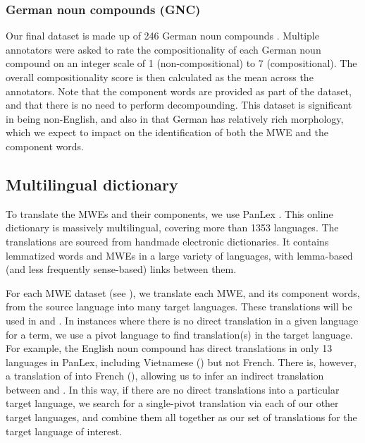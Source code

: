 \documentclass[output=paper
,modfonts
,nonflat]{langsci/langscibook}
\begin{document}
\subsubsection{German noun compounds (GNC)}

Our final dataset is made up of 246 German noun compounds
\citep{von2009,SchulteImWalde+:2013}. Multiple annotators were asked to rate the
compositionality of each German noun compound on an integer scale of 1
(non-compositional) to 7 (compositional). The overall compositionality
score is then calculated as the mean across the annotators. Note that
the component words are provided as part of the dataset, and that
there is no need to perform decompounding. This dataset is significant
in being non-English, and also in that German has relatively rich
morphology, which we expect to impact on the identification of both
the MWE and the component words.


\subsection{Multilingual dictionary\label{sec:multilingdict}}

To translate the MWEs and their components, we use PanLex
\citep{baldwin2010}. This online dictionary is massively multilingual,
covering more than 1353 languages. The translations are sourced from
handmade electronic dictionaries. It contains lemmatized words and
MWEs in a large variety of languages, with lemma-based (and less
frequently sense-based) links between them. 

For each MWE dataset (see ), we translate each
MWE, and its component words, from the source language into many
target languages. These translations will be used in
 and . In instances where
there is no direct translation in a given language for a term, we use
a pivot language to find translation(s) in the target language. For
example, the English noun compound  has direct
translations in only 13 languages in PanLex, including Vietnamese
() but not French. There is, however, a
translation of  into French
(), allowing us to infer an indirect translation
between  and . In this way,
if there are no direct translations into a particular target language,
we search for a single-pivot translation via each of our other target
languages, and combine them all together as our set of translations
for the target language of interest.
\end{document}
